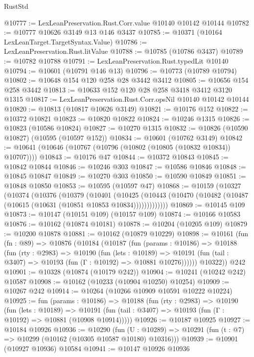 \begin{lexlean}{RustStd}
\begin{coremodule}
@10777 := LexLeanPreservation.Rust.Corr.value @10140 @10142 @10144
@10782 := @10777 @10626 @3149 @13 @146 @3437
@10785 := @10371 (@10164 LexLeanTarget.TargetSyntax.Value)
@10786 := LexLeanPreservation.Rust.litValue
@10788 := @10785 (@10786 @3437)
@10789 := @10782 @10788
@10791 := LexLeanPreservation.Rust.typedLit @10140
@10794 := @10601 (@10791 @146 @13)
@10796 := @10773 (@10789 @10794)
@10802 := @10648 @154 @120 @258 @28 @3442 @3412
@10805 := @10656 @154 @258 @3442
@10813 := @10633 @152 @120 @28 @258 @3418 @3412 @3120 @1315
@10817 := LexLeanPreservation.Rust.Corr.opsNil @10140 @10142 @10144
@10820 := @10813 (@10817 @10626 @3149)
@10821 := @10176 @152
@10822 := @10372 @10821
@10823 := @10820 @10822
@10824 := @10246 @1315
@10826 := @10823 (@10586 @10824)
@10827 := @10270 @1315
@10832 := @10826 (@10590 @10827) (@10595 (@10597 @152))
@10834 := @10601 (@10762 @3149)
@10842 := @10641 (@10646 (@10767 (@10796 (@10802 (@10805 (@10832 @10834)) @10707))))
@10843 := @10176 @47
@10844 := @10372 @10843
@10845 := @10842 @10844
@10846 := @10246 @303
@10847 := @10586 @10846
@10848 := @10845 @10847
@10849 := @10270 @303
@10850 := @10590 @10849
@10851 := @10848 @10850
@10853 := @10595 (@10597 @47)
@10868 := @10159
    (@10327
      (@10374
        (@10376
          (@10379
            (@10401
              (@10425
                (@10443 (@10470 (@10482 (@10487 (@10615 (@10631 (@10851 @10853 @10834)))))))))))))
@10869 := @10145 @109
@10873 := @10147 (@10151 @109) (@10157 @109)
@10874 := @10166 @10583
@10876 := @10162 (@10874 @10181)
@10878 := @10204 (@10205 @109)
@10879 := @10200 @10878
@10881 := @10162 (@10879 @10229)
@10898 := @10161
    (fun (fn : @89) =>
    @10876
      (@10184
        (@10187
          (fun (params : @10186) =>
          @10188
            (fun (rty : @2983) =>
            @10190
              (fun (lets : @10189) =>
              @10191 (fun (tail : @3407) => @10193 (fun (Γ : @10192) => @10881 @10276))))))
        @10322))
    @242
@10901 := @10328 (@10874 (@10179 @242))
@10904 := @10241 (@10242 @242) @10587
@10908 := @10162 (@10233 (@10904 @10250) @10254)
@10909 := @10267 @242
@10914 := @10264 (@10266 @10909 @10591 @10222 @10224)
@10925 := fun (params : @10186) =>
  @10188
    (fun (rty : @2983) =>
    @10190
      (fun (lets : @10189) =>
      @10191 (fun (tail : @3407) => @10193 (fun (Γ : @10192) => @10881 (@10908 @10914)))))
@10926 := @10187 @10925
@10927 := @10184 @10926
@10936 := @10290
    (fun (U : @10289) => @10291 (fun (t : @7) => @10299 (@10162 (@10305 @10587 @10180) @10316)))
@10939 := @10901 (@10927 @10936) @10584
@10941 := @10147 @10926 @10936

\end{coremodule}
\end{lexlean}
